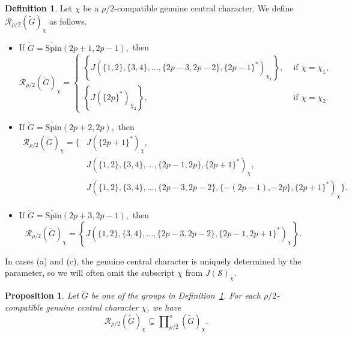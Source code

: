 \documentclass{amsart}
\newcommand{\Spin}{{\mathrm{Spin}}}
\newtheorem{prop}[thm]{Proposition}
\theoremstyle{definition}
\newtheorem{definition}[thm]{Definition}
\begin{document}
\begin{definition}\label{d:list}
Let \(\chi\) be a \(\rho/2\)-compatible genuine central character.
We define
\(\mathcal R_{\rho/2}(\widetilde G)_\chi\)
as follows.

\begin{itemize}
\item[(a)]
If $\widetilde G=\widetilde{\Spin}(2p+1,2p-1),$
then
$$
\mathcal R_{\rho/2}(\widetilde G)_{\chi}
=\begin{cases}
    \left\{
J(\{1,2\},\{3,4\},\ldots,
  \{2p-3,2p-2\},\{2p-1\}^*)_{\chi_1}
\right\}, &\text{ if }  \chi=\chi_1,     \\
\left\{
J(\{2p\}^*)_{\chi_2}
\right\}, &\text{ if  } \chi=\chi_2.
\end{cases}
$$
\item[(b)]
If $\widetilde G=\widetilde{\Spin}(2p+2,2p),$
then
\begin{align*}
\mathcal R_{\rho/2}(\widetilde G)_\chi
=\bigl\{
&
J(\{2p+1\}^*)_\chi,\\
&
J(\{1,2\},\{3,4\},\ldots,
  \{2p-1,2p\},\{2p+1\}^*)_\chi,\\
&
J(\{1,2\},\{3,4\},\ldots,
  \{2p-3,2p-2\},
  \{-(2p-1),-2p\},\{2p+1\}^*)_\chi
\bigr\}.
\end{align*}

\item[(c)]
If $\widetilde G=\widetilde{\Spin}(2p+3,2p-1),$ then
\[
\mathcal R_{\rho/2}(\widetilde G)_\chi
=
\left\{
J(\{1,2\},\{3,4\},\ldots,
  \{2p-3,2p-2\},
  \{2p-1,2p+1\}^*)_\chi
\right\}.
\]

\end{itemize}
\end{definition}
In cases (a) and (c), the genuine central character is uniquely
determined by the parameter, so we will often omit the subscript
\(\chi\) from \(J(\mathcal S)_\chi\).


\begin{prop}\label{p:RD1}
Let \(\widetilde G\) be one of the groups in
Definition~\ref{d:list}. For each \(\rho/2\)-compatible genuine
central character \(\chi\), we have
\[
\mathcal R_{\rho/2}(\widetilde G)_\chi
\subseteq
\prod\nolimits_{\rho/2}^{s}(\widetilde G)_\chi.
\]
\end{prop}
\end{document}
